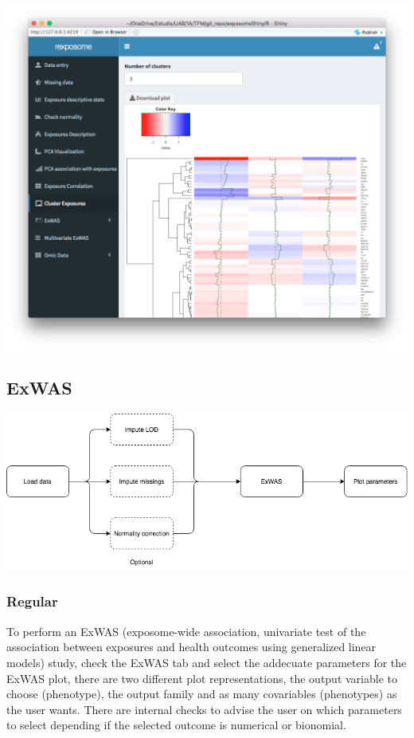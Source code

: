 \documentclass[
]{book}
\begin{document}
\includegraphics{images/analysis6_4.png}

\hypertarget{exwas}{%
\subsection{ExWAS}\label{exwas}}

\includegraphics{images/analysis7_1.png}

\hypertarget{regular}{%
\subsubsection{Regular}\label{regular}}

To perform an ExWAS (exposome-wide association, univariate test of the association between exposures and health outcomes using generalized linear models) study, check the ExWAS tab and select the addecuate parameters for the ExWAS plot, there are two different plot representations, the output variable to choose (phenotype), the output family and as many covariables (phenotypes) as the user wants. There are internal checks to advise the user on which parameters to select depending if the selected outcome is numerical or bionomial.
\end{document}
